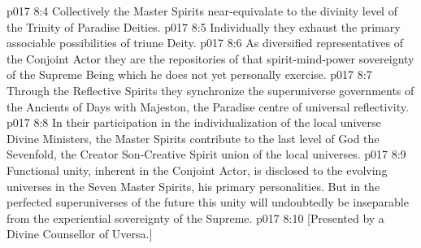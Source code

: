 \vs p017 8:4 \bibnobreakspace Collectively the Master Spirits near\hyp{}equivalate to the divinity level of the Trinity of Paradise Deities.
\vs p017 8:5 \bibnobreakspace Individually they exhaust the primary associable possibilities of triune Deity.
\vs p017 8:6 \bibnobreakspace As diversified representatives of the Conjoint Actor they are the repositories of that spirit\hyp{}mind\hyp{}power sovereignty of the Supreme Being which he does not yet personally exercise.
\vs p017 8:7 \bibnobreakspace Through the Reflective Spirits they synchronize the superuniverse governments of the Ancients of Days with Majeston, the Paradise centre of universal reflectivity.
\vs p017 8:8 \bibnobreakspace In their participation in the individualization of the local universe Divine Ministers, the Master Spirits contribute to the last level of God the Sevenfold, the Creator Son\hyp{}Creative Spirit union of the local universes.
\vs p017 8:9 \pc Functional unity, inherent in the Conjoint Actor, is disclosed to the evolving universes in the Seven Master Spirits, his primary personalities. But in the perfected superuniverses of the future this unity will undoubtedly be inseparable from the experiential sovereignty of the Supreme.
\vsetoff
\vs p017 8:10 [Presented by a Divine Counsellor of Uversa.]
\quizlink
